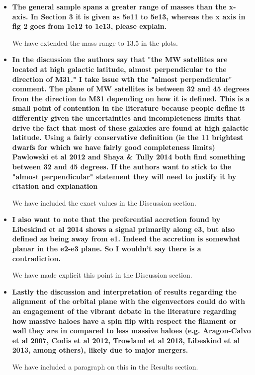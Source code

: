 \documentclass{article}
\begin{document}
\begin{itemize}
\item
{\bf The general sample spans a greater range of masses than the x-axis. In Section 3 it is given as 5e11 to 5e13, whereas the x axis in fig 2 goes from 1e12 to 1e13, please explain.}

We have extended the mass range to 13.5 in the plots.


\item
{\bf In the discussion the authors say that "the MW satellites are located at high galactic latitude, almost perpendicular to the direction of M31." I take issue wth the "almost perpendicular" comment. The plane of MW satellites is between 32 and 45 degrees from the direction to M31 depending on how it is defined. This is a small point of contention in the literature because people define it differently given the uncertainties and incompleteness limits that drive the fact that most of these galaxies are found at high galactic latitude. 
Using a fairly conservative definition (ie the 11 brightest dwarfs for which we have fairly good completeness limits) Pawlowski et al 2012 and Shaya \& Tully 2014 both find something between 32 and 45 degrees. If the authors want to stick to the "almost perpendicular" statement they will need to justify it by citation and explanation}


We have included the exact values in the Discussion section.

\item
{\bf I also want to note that the preferential accretion found by Libeskind et al 2014 shows a signal primarily along e3, but also defined as being away from e1. Indeed the accretion is somewhat planar in the e2-e3 plane. So I wouldn't say there is a contradiction.}

We have made explicit this point in the Discussion section.

\item
{\bf Lastly the discussion and interpretation of results regarding the alignment of the orbital plane with the eigenvectors could do with an engagement of the vibrant debate in the literature regarding how massive haloes have a spin flip with respect the filament or wall they are in compared to less massive haloes (e.g. Aragon-Calvo et al 2007, Codis et al 2012, Trowland et al 2013, Libeskind et al 2013, among others), likely due to major mergers.} 

We have included a paragraph on this in the Results section.

\end{itemize}
\end{document}
